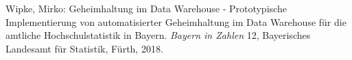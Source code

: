 \begin{thebibliography}{9}
Wipke, Mirko: Geheimhaltung im Data Warehouse - Prototypische Implementierung von automatisierter Geheimhaltung im Data Warehouse für die amtliche Hochschulstatistik in Bayern. \emph{Bayern in Zahlen} 12, Bayerisches Landesamt für Statistik, Fürth, 2018.





\end{thebibliography}%

\newpage%


